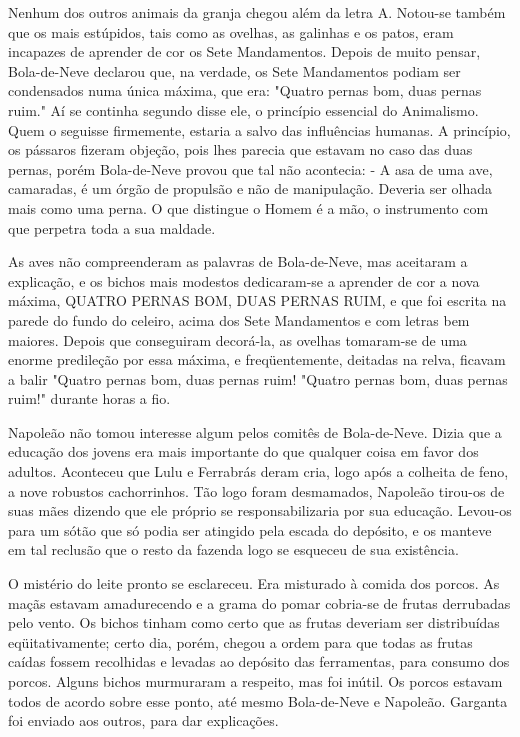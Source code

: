 Nenhum dos outros animais da granja chegou além da letra A. Notou-se também que os mais estúpidos,
tais como as ovelhas, as galinhas e os patos, eram incapazes de aprender de cor os Sete Mandamentos.
Depois de muito pensar, Bola-de-Neve declarou que, na verdade, os Sete Mandamentos podiam ser
condensados numa única máxima, que era: "Quatro pernas bom, duas pernas ruim." Aí se continha
segundo disse ele, o princípio essencial do Animalismo. Quem o seguisse firmemente, estaria a salvo das
influências humanas. A princípio, os pássaros fizeram objeção, pois lhes parecia que estavam no caso das
duas pernas, porém Bola-de-Neve provou que tal não acontecia:
- A asa de uma ave, camaradas, é um órgão de propulsão e não de manipulação. Deveria ser olhada mais
como uma perna. O que distingue o Homem é a mão, o instrumento com que perpetra toda a sua
maldade.

As aves não compreenderam as palavras de Bola-de-Neve, mas aceitaram a explicação, e os bichos mais
modestos dedicaram-se a aprender de cor a nova máxima, QUATRO PERNAS BOM, DUAS PERNAS RUIM, e que foi escrita na parede do fundo do celeiro, acima dos Sete Mandamentos e com letras bem
maiores. Depois que conseguiram decorá-la, as ovelhas tomaram-se de uma enorme predileção por essa
máxima, e freqüentemente, deitadas na relva, ficavam a balir "Quatro pernas bom, duas pernas ruim!
"Quatro pernas bom, duas pernas ruim!" durante horas a fio.

Napoleão não tomou interesse algum pelos comitês de Bola-de-Neve. Dizia que a educação dos jovens
era mais importante do que qualquer coisa em favor dos adultos. Aconteceu que Lulu e Ferrabrás deram
cria, logo após a colheita de feno, a nove robustos cachorrinhos. Tão logo foram desmamados, Napoleão
tirou-os de suas mães dizendo que ele próprio se responsabilizaria por sua educação. Levou-os para um
sótão que só podia ser atingido pela escada do depósito, e os manteve em tal reclusão que o resto da
fazenda logo se esqueceu de sua existência.

O mistério do leite pronto se esclareceu. Era misturado à comida dos porcos. As maçãs estavam
amadurecendo e a grama do pomar cobria-se de frutas derrubadas pelo vento. Os bichos tinham como
certo que as frutas deveriam ser distribuídas eqüitativamente; certo dia, porém, chegou a ordem para que
todas as frutas caídas fossem recolhidas e levadas ao depósito das ferramentas, para consumo dos porcos.
Alguns bichos murmuraram a respeito, mas foi inútil. Os porcos estavam todos de acordo sobre esse
ponto, até mesmo Bola-de-Neve e Napoleão. Garganta foi enviado aos outros, para dar explicações.

